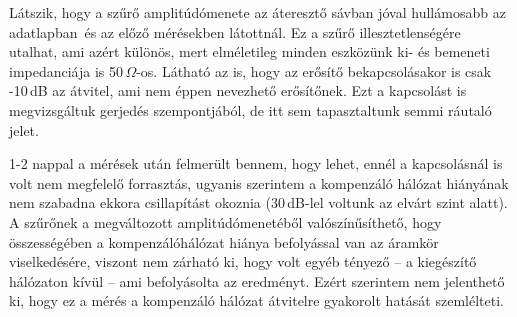 Látszik, hogy a szűrő amplitúdómenete az áteresztő sávban jóval hullámosabb az adatlapban\,\cite{SAW} és az előző mérésekben látottnál. Ez a szűrő illesztetlenségére utalhat, ami azért különös, mert elméletileg minden eszközünk ki- és bemeneti impedanciája is 50\,$\Omega$-os. Látható az is, hogy az erősítő bekapcsolásakor is csak -10\,dB az átvitel, ami nem éppen nevezhető erősítőnek. Ezt a kapcsolást is megvizsgáltuk gerjedés szempontjából, de itt sem tapasztaltunk semmi ráutaló jelet.

1-2 nappal a mérések után felmerült bennem, hogy lehet, ennél a kapcsolásnál is volt nem megfelelő forrasztás, ugyanis szerintem a kompenzáló hálózat hiányának nem szabadna ekkora csillapítást okoznia (30\,dB-lel voltunk az elvárt szint alatt). A szűrőnek a megváltozott amplitúdómenetéből valószínűsíthető, hogy összességében a kompenzálóhálózat hiánya befolyással van az áramkör viselkedésére, viszont nem zárható ki, hogy volt egyéb tényező -- a kiegészítő hálózaton kívül -- ami befolyásolta az eredményt. Ezért szerintem nem jelenthető ki, hogy ez a mérés a kompenzáló hálózat átvitelre gyakorolt hatását szemlélteti.